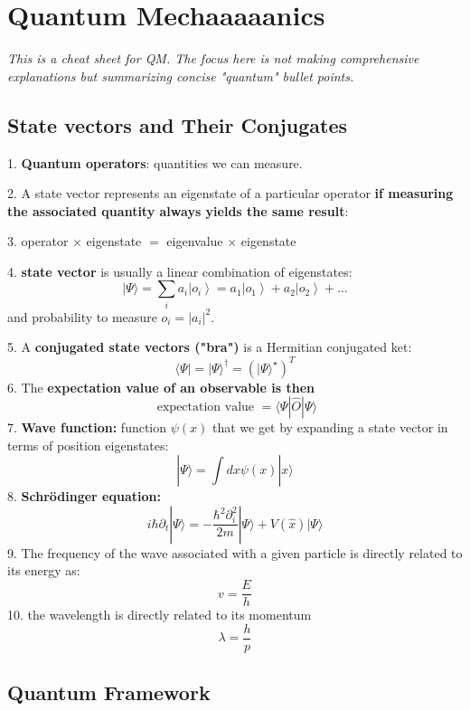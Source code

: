 \chapter{Quantum Mechaaaaanics}
\textit{This is a cheat sheet for QM. The focus here is not making comprehensive explanations but summarizing concise "quantum" bullet points.}

\section{State vectors and Their Conjugates}
1. \textbf{Quantum operators}: quantities we can measure.

2. A state vector represents an eigenstate of a particular operator \textbf{if measuring the associated quantity always yields the same result}:

3. operator $\times$ eigenstate $=$ eigenvalue $\times$ eigenstate

4. \textbf{state vector} is usually a linear combination of eigenstates:
$$
|\Psi\rangle=\sum_{i} a_{i}\left|o_{i}\right\rangle= a_{1}\left|o_{1}\right\rangle+ a_{2}\left|o_{2}\right\rangle+\dots
$$
and probability to measure $o_{i}=\left|a_{i}\right|^{2}$.

5. A \textbf{conjugated state vectors ("bra")} is a Hermitian conjugated ket:
$$
\langle\Psi|=| \Psi\rangle^{\dagger}=\left(|\Psi\rangle^{\star}\right)^{T}
$$
6. The \textbf{expectation value of an observable is then}
\begin{equation}
\text { expectation value }=\langle\Psi|\hat{O}| \Psi\rangle
\label{expectation}
\end{equation}
7. \textbf{Wave function:} function $\psi(x)$ that we get by expanding a state vector in terms of position eigenstates:
\begin{equation}
|\Psi\rangle=\int d x \psi(x)|x\rangle
\end{equation}
8. \textbf{Schrödinger equation:}
\begin{equation}
i \hbar \partial_{t}|\Psi\rangle=-\frac{\hbar^{2} \partial_{i}^{2}}{2 m}|\Psi\rangle+ V(\hat{x})|\Psi\rangle
\end{equation}
9. The frequency of the wave associated with a given particle is directly related to its energy as:
\begin{equation}
v=\frac{E}{h}
\end{equation}
10. the wavelength is directly related to its momentum 
\begin{equation}
\lambda=\frac{h}{p}
\end{equation}

\section{Quantum Framework}